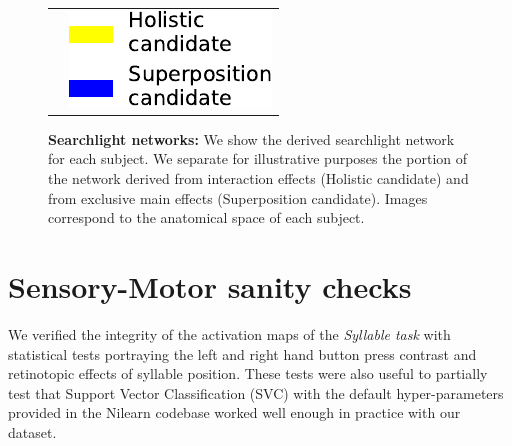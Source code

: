 \begin{figure}[ht]
\begin{tabular}{cc}
&{\includegraphics[width=.3\linewidth]{figures/part_II/searchlight-regions_legend.pdf}}
\hspace{-1ex} \\
\end{tabular}
\vspace{3ex}
\caption{\textbf{Searchlight networks:} We show the derived searchlight network for each subject. We separate for illustrative purposes the portion of the network derived from interaction effects (Holistic candidate) and from exclusive main effects (Superposition candidate). Images correspond to the anatomical space of each subject.}
\label{fig:searchlight_regions}
\end{figure}


\section{Sensory-Motor sanity checks}\label{sec:sanity_checks}
We verified the integrity of the activation maps of the \emph{Syllable task} with statistical tests portraying the left and right hand button press contrast and retinotopic effects of syllable position.
These tests were also useful to partially test that Support Vector Classification (SVC) with the default hyper-parameters provided in the Nilearn\citep{abraham2014machine} codebase worked well enough in practice with our dataset.

